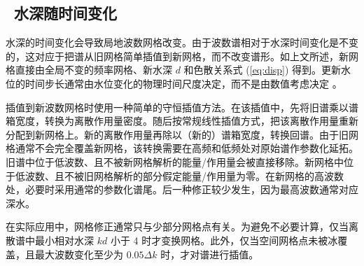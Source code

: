 \vssub
\subsection{~水深随时间变化} \label{sub:num_depth}
\vssub

水深的时间变化会导致局地波数网格改变。由于波数谱相对于水深时间变化是不变的，这对应于把谱从旧网格简单插值到新网格，而不改变谱形。如上文所述，新网格直接由全局不变的频率网格、新水深 $d$ 和色散关系式 (\ref{eq:disp}) 得到。更新水位的时间步长通常由水位变化的物理时间尺度决定，而不是由数值考虑决定 \citep{tol:GAOS98b}。

插值到新波数网格时使用一种简单的守恒插值方法。在该插值中，先将旧谱乘以谱箱宽度，转换为离散作用量密度。随后按常规线性插值方式，把该离散作用量重新分配到新网格上。新的离散作用量再除以（新的）谱箱宽度，转换回谱。由于旧网格通常不会完全覆盖新网格，该转换需要在高频和低频处对原始谱作参数化延拓。旧谱中位于低波数、且不被新网格解析的能量/作用量会被直接移除。新网格中位于低波数、且不被旧网格解析的部分假定能量/作用量为零。在新网格的高波数处，必要时采用通常的参数化谱尾。后一种修正较少发生，因为最高波数通常对应深水。

在实际应用中，网格修正通常只与少部分网格点有关。为避免不必要计算，仅当离散谱中最小相对水深 $kd$ 小于 4 时才变换网格。此外，仅当空间网格点未被冰覆盖，且最大波数变化至少为 $0.05 \Delta k$ 时，才对谱进行插值。
